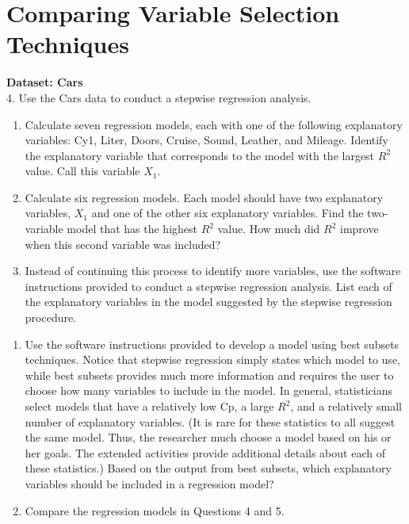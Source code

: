 \documentclass[
]{report}
\begin{document}
\section*{Comparing Variable Selection Techniques}\label{comparing-variable-selection-techniques}

\textbf{Dataset: Cars}\\
4. Use the Cars data to conduct a stepwise regression analysis.

\begin{enumerate}
\def\labelenumi{\alph{enumi}.}
\item
  Calculate seven regression models, each with one of the following explanatory variables: Cy1, Liter, Doors, Cruise, Sound, Leather, and Mileage. Identify the explanatory variable that corresponds to the model with the largest \(R^2\) value. Call this variable \(X_1\).
\item
  Calculate six regression models. Each model should have two explanatory variables, \(X_1\) and one of the other six explanatory variables. Find the two-variable model that has the highest \(R^2\) value. How much did \(R^2\) improve when this second variable was included?
\item
  Instead of continuing this process to identify more variables, use the software instructions provided to conduct a stepwise regression analysis. List each of the explanatory variables in the model suggested by the stepwise regression procedure.
\end{enumerate}

\begin{enumerate}
\def\labelenumi{\arabic{enumi}.}
\setcounter{enumi}{4}
\item
  Use the software instructions provided to develop a model using best subsets techniques. Notice that stepwise regression simply states which model to use, while best subsets provides much more information and requires the user to choose how many variables to include in the model. In general, statisticians select models that have a relatively low Cp, a large \(R^2\), and a relatively small number of explanatory variables. (It is rare for these statistics to all suggest the same model. Thus, the researcher much choose a model based on his or her goals. The extended activities provide additional details
  about each of these statistics.) Based on the output from best subsets, which explanatory variables should be included in a regression model?
\item
  Compare the regression models in Questions 4 and 5.
\end{enumerate}
\end{document}
